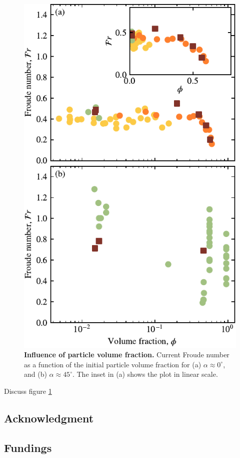 \documentclass[twocolumn]{article}
\begin{document}
\begin{figure}
	\centering
	\includegraphics{figure6.pdf}
	\caption{\textbf{Influence of particle volume fraction.} Current Froude number as a function of the initial particle volume fraction for (a) $\alpha \approx 0^\circ$, and (b) $\alpha \approx 45^\circ$. The inset in (a) shows the plot in linear scale.}
	\label{fig:fig6}
\end{figure}

Discuss figure \ref{fig:fig6}


\subsection*{Acknowledgment}

\subsection*{Fundings}






\newpage
\end{document}
